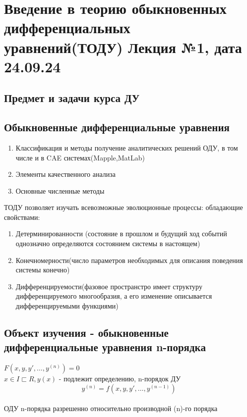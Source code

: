 \documentclass[12pt]{article}
\begin{document}
  \tableofcontents
  \pagebreak
  \section{Введение в теорию обыкновенных дифференциальных уравнений(ТОДУ) Лекция №1, дата 24.09.24}
  \subsection{Предмет и задачи курса ДУ}
  \subsection*{Обыкновенные дифференциальные уравнения}
  \begin{enumerate}
    \item Классификация и методы получение аналитических решений ОДУ, в том числе и в CAE системах(Mapple,MatLab)
    \item Элементы качественного анализа
    \item Основные численные методы
  \end{enumerate}
  ТОДУ позволяет изучать всевозможные эволюционные процессы: обладающие свойствами:
  \begin{enumerate}
    \item Детерминированности (состояние в прошлом и будущий ход событий однозначно определяются
    состоянием системы в настоящем)
    \item Конечномерности(число параметров необходимых для описания поведения системы конечно)
    \item Дифференцируемости(фазовое пространстро имеет структуру дифференцируемого многообразия,
    а его изменение описывается дифференцируемыми функциями)
  \end{enumerate}
  \subsection{Объект изучения - обыкновенные дифференциальные уравнения n-порядка}
  $F(x,y,y',\dots,y^{(n)})=0$\\
  $x \in I \sqsubset R,y(x)$ - подлежит определению, n-порядок ДУ\\
  \[y^{(n)}=f(x,y,y',\dots,y^{(n-1)})\] \\
  ОДУ n-порядка разрешенно относительно производной (n)-го порядка
\end{document}
